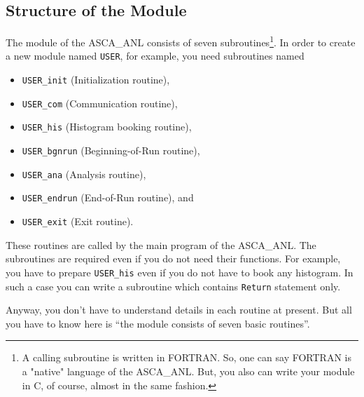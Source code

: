 \subsection{Structure of the Module}
The module of the ASCA\_ANL consists of seven subroutines\footnote{
A calling subroutine is written in FORTRAN.
So,
one can say FORTRAN is a "native" language of the ASCA\_ANL.
But,
you also can write your module in C,
of course,
almost in the same fashion.
}.
In order to create a new module named {\tt USER},
for example,
you need subroutines named
\begin{itemize}
\item {\tt USER\_init} (Initialization routine),
\item {\tt USER\_com} (Communication routine),
\item {\tt USER\_his} (Histogram booking routine),
\item {\tt USER\_bgnrun} (Beginning-of-Run routine),
\item {\tt USER\_ana} (Analysis routine),
\item {\tt USER\_endrun} (End-of-Run routine), and
\item {\tt USER\_exit} (Exit routine).
\end{itemize}
These routines are called by the main program of the ASCA\_ANL.
The subroutines are required even if you do not need their functions.
For example,
you have to prepare {\tt USER\_his}
even if you do not have to book any histogram.
In such a case
you can write a subroutine which contains {\tt Return} statement only.

Anyway,
you don't have to understand details in each routine at present.
But all you have to know here is
``the module consists of seven basic routines''.

